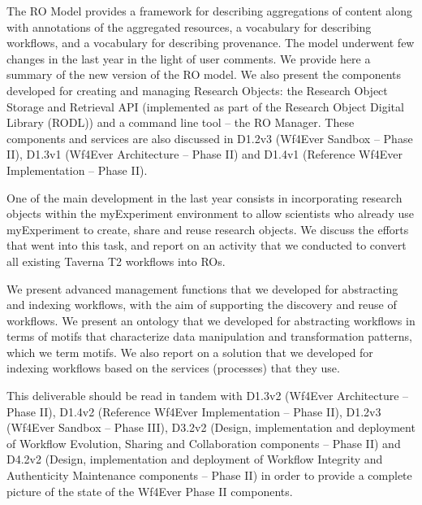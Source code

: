 \documentclass[a4paper, twoside, 11pt]{article}
\begin{document}
The RO Model provides a framework for describing aggregations of
content along with annotations of the aggregated resources, a
vocabulary for describing workflows, and a vocabulary for describing
provenance. The model underwent few changes in the last year in the light of user comments. 
We provide here a summary of the new version of the RO model.
We also present the components developed for creating and managing Research Objects: the
Research Object Storage and Retrieval API (implemented as part of the
Research Object Digital Library (RODL)) and a command line tool -- the
RO Manager. These components and services are also discussed in D1.2v3
(Wf4Ever Sandbox -- Phase II), D1.3v1 (Wf4Ever Architecture -- Phase
II) and D1.4v1 (Reference Wf4Ever Implementation -- Phase II). 

One of the main development in the last year consists in incorporating research objects within the myExperiment environment to allow scientists who already use myExperiment to create, share and reuse research objects. We discuss the efforts that went into this task, and report on an activity that we conducted to convert all existing Taverna T2 workflows into ROs.

We  present advanced management functions that we developed for abstracting and indexing workflows, with the aim of supporting the discovery and reuse of workflows. We present an ontology that we developed for abstracting workflows in terms of motifs that characterize data manipulation and transformation patterns, which we term motifs. We also report on a solution that we developed for indexing workflows based on the services (processes) that they use.

This deliverable should be read in tandem with D1.3v2 (Wf4Ever
Architecture -- Phase II), D1.4v2 (Reference Wf4Ever Implementation --
Phase II), D1.2v3 (Wf4Ever Sandbox -- Phase III), D3.2v2 (Design,
implementation and deployment of Workflow Evolution, Sharing and
Collaboration components -- Phase II) and D4.2v2 (Design,
implementation and deployment of Workflow Integrity and Authenticity
Maintenance components -- Phase II) in order to provide a complete
picture of the state of the Wf4Ever Phase II components.

\clearpage

\tableofcontents
\clearpage
\listoftables %
\listoffigures %

\clearpage
\sloppy

\end{document}
